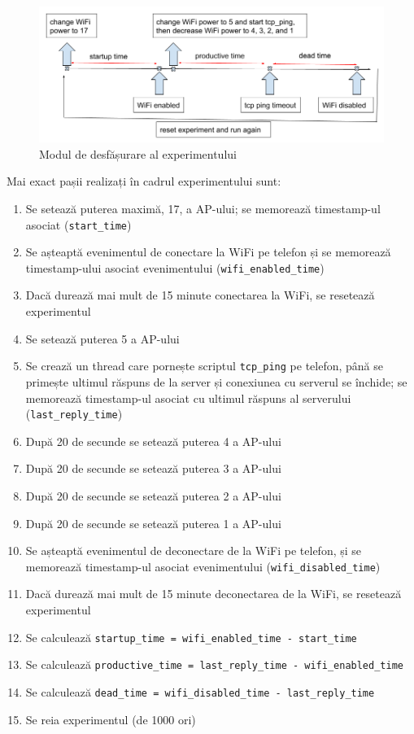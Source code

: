 \begin{figure}[h!]
	\centering
	\includegraphics[scale=0.5]{figures/experiments/experiment_design.png}
	\caption{Modul de desfășurare al experimentului}
    	\label{fig:expdesign}
\end{figure}

Mai exact pașii realizați în cadrul experimentului sunt:
\begin{enumerate}
	\item Se setează puterea maximă, 17,  a AP-ului; se memorează timestamp-ul asociat (\texttt{start\_time})
	\item Se așteaptă evenimentul de conectare la WiFi pe telefon și se memorează timestamp-ului asociat evenimentului (\texttt{wifi\_enabled\_time})
	\item Dacă durează mai mult de 15 minute conectarea la WiFi, se resetează experimentul
	\item Se setează puterea 5 a AP-ului
	\item Se crează un thread care pornește scriptul \texttt{tcp\_ping} pe telefon, până se primește ultimul răspuns de la server și conexiunea cu serverul se închide; se memorează timestamp-ul asociat cu ultimul răspuns al serverului (\texttt{last\_reply\_time})
	\item După 20 de secunde se setează puterea 4 a AP-ului
	\item După 20 de secunde se setează puterea 3 a AP-ului
	\item După 20 de secunde se setează puterea 2 a AP-ului
	\item După 20 de secunde se setează puterea 1 a AP-ului
	\item Se așteaptă evenimentul de deconectare de la WiFi pe telefon, și se memorează timestamp-ul asociat evenimentului (\texttt{wifi\_disabled\_time})
	\item Dacă durează mai mult de 15 minute deconectarea de la WiFi, se resetează experimentul
	\item Se calculează \texttt{startup\_time = wifi\_enabled\_time - start\_time}
	\item Se calculează \texttt{productive\_time = last\_reply\_time - wifi\_enabled\_time}
	\item Se calculează \texttt{dead\_time = wifi\_disabled\_time - last\_reply\_time}
	\item Se reia experimentul (de 1000 ori)
\end{enumerate}

